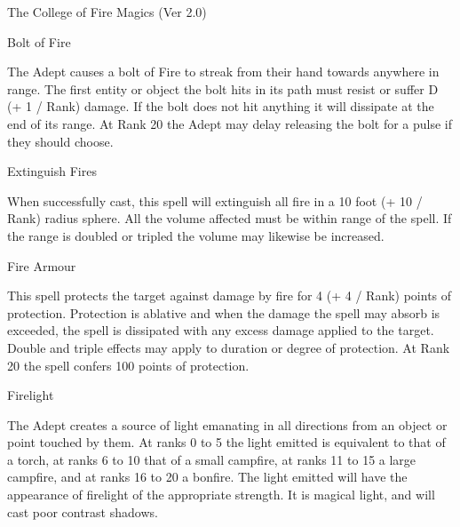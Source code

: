 \begin{Chapter}{The College of Fire Magics (Ver 2.0)}
\begin{spell}[G-1]{Bolt of Fire}

\begin{effects}
The Adept causes a bolt of Fire to streak from their hand towards
anywhere in range.  The first entity or object the bolt hits in its
path must resist or suffer D (+ 1 / Rank) damage.  If the bolt does
not hit anything it will dissipate at the end of its range. At Rank 20
the Adept may delay releasing the bolt for a pulse if they should
choose.

\end{effects}
\end{spell}

\begin{spell}[G-2]{Extinguish Fires}

\begin{effects}
When successfully cast, this spell will extinguish all fire in a 10
foot (+ 10 / Rank) radius sphere.  All the volume affected must be
within range of the spell. If the range is doubled or tripled the
volume may likewise be increased.
\end{effects}
\end{spell}

\begin{spell}[G-3]{Fire Armour}
\begin{effects}
This spell protects the target against damage by fire for 4 (+ 4 /
Rank) points of protection.  Protection is ablative and when the
damage the spell may absorb is exceeded, the spell is dissipated with
any excess damage applied to the target.  Double and triple effects
may apply to duration or degree of protection.  At Rank 20 the spell
confers 100 points of protection.
\end{effects}
\end{spell}

\begin{spell}[G-4]{Firelight}

\begin{effects}
The Adept creates a source of light emanating in all directions from
an object or point touched by them. At ranks 0 to 5 the light emitted
is equivalent to that of a torch, at ranks 6 to 10 that of a small
campfire, at ranks 11 to 15 a large campfire, and at ranks 16 to 20 a
bonfire.  The light emitted will have the appearance of firelight of
the appropriate strength.  It is magical light, and will cast poor
contrast shadows.
\end{effects}
\end{spell}


\end{Chapter}
